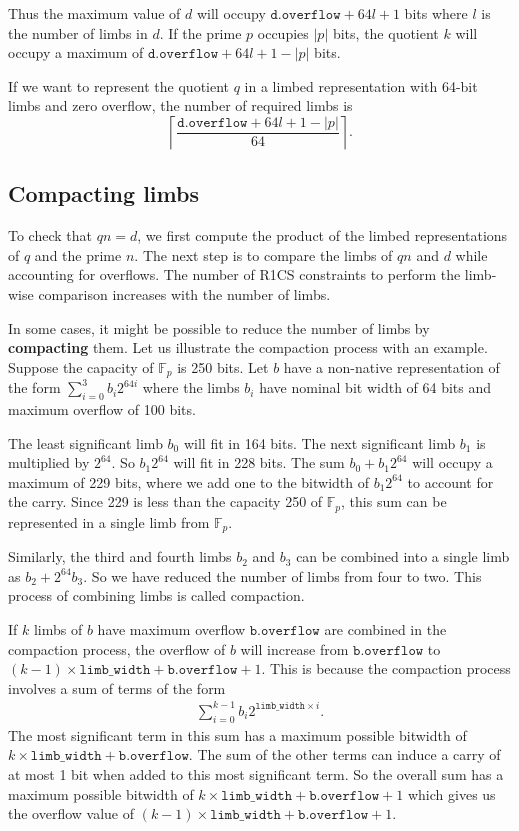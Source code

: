 \documentclass[a4paper, 12pt]{article}
\begin{document}
Thus the maximum value of $d$ will occupy $\texttt{d.overflow}+64l+1$ bits where $l$ is the number of limbs in $d$. If the prime $p$ occupies $|p|$ bits, the quotient $k$ will occupy a maximum of $\texttt{d.overflow}+64l+1 -|p|$ bits.

If we want to represent the quotient $q$  in a limbed representation with 64-bit limbs and zero overflow, the number of required limbs is
$$\left\lceil \frac{\texttt{d.overflow}+64l+1 -|p|}{64}\right\rceil.$$

\subsection{Compacting limbs}
To check that $qn = d$, we first compute the product of the limbed representations of $q$ and the prime $n$. The next step is to compare the limbs of $qn$ and $d$ while accounting for overflows. The number of R1CS constraints to perform the limb-wise comparison increases with the number of limbs.

In some cases, it might be possible to reduce the number of limbs by \textbf{compacting} them. Let us illustrate the compaction process with an example. Suppose the capacity of $\mathbb{F}_p$ is 250 bits. Let $b$ have a non-native representation of the form $\sum_{i=0}^3 b_i 2^{64i}$ where the limbs $b_i$ have nominal bit width of 64 bits and maximum overflow of 100 bits.

The least significant limb $b_0$ will fit in 164 bits. The next significant limb $b_1$ is multiplied by $2^{64}$. So $b_1 2^{64}$ will fit in 228 bits. The sum $b_0 + b_1 2^{64}$ will occupy a maximum of 229 bits, where we add one to the bitwidth of $b_1 2^{64}$ to account for the carry. Since 229 is less than the capacity 250 of $\mathbb{F}_p$, this sum can be represented in a single limb from $\mathbb{F}_p$.

Similarly, the third and fourth limbs $b_2$ and $b_3$ can be combined into a single limb as $b_2 + 2^{64} b_3$. So we have reduced the number of limbs from four to two. This process of combining limbs is called compaction.

If $k$ limbs of $b$ have maximum overflow $\texttt{b.overflow}$ are combined in the compaction process, the overflow of $b$ will increase from $\texttt{b.overflow}$ to $(k-1) \times \texttt{limb\_width} + \texttt{b.overflow} + 1$. This is because the compaction process involves a sum of terms of the form
\begin{align*}
  \sum_{i=0}^{k-1} b_i 2^{\texttt{limb\_width} \times i}.
\end{align*}
The most significant term in this sum has a maximum possible bitwidth of $k\times \texttt{limb\_width} + \texttt{b.overflow}$. The sum of the other terms can induce a carry of at most 1 bit when added to this most significant term. So the overall sum has a maximum possible bitwidth of $k\times \texttt{limb\_width} + \texttt{b.overflow}+1$ which gives us the overflow value of $(k-1) \times \texttt{limb\_width} + \texttt{b.overflow} + 1$.
\end{document}
